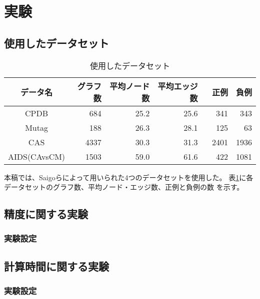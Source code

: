 \section{実験}
\label{exp_cooc}
\subsection{使用したデータセット}

\begin{table}
  \centering
\begin{tabular}{|c|r|r|r|r|r|}
\hline
データ名 & グラフ数 & 平均ノード数 & 平均エッジ数 & 正例　& 負例\\
\hline \hline
CPDB  & 684 & 25.2 & 25.6 & 341 & 343\\
\hline
Mutag & 188 & 26.3 & 28.1 & 125 & 63\\
\hline
CAS & 4337 & 30.3 & 31.3 & 2401 & 1936\\
\hline
AIDS(CAvsCM) & 1503 & 59.0 & 61.6 & 422 & 1081\\
\hline
\end{tabular}
\caption{使用したデータセット}
\label{dataset}
\end{table}

本稿では、Saigoら\cite{gBoost}によって用いられた4つのデータセットを使用した。
表\ref{dataset}に各データセットのグラフ数、平均ノード・エッジ数、正例と負例の数
を示す。

\subsection{精度に関する実験}
\subsubsection{実験設定}
\subsection{計算時間に関する実験}
\subsubsection{実験設定}
